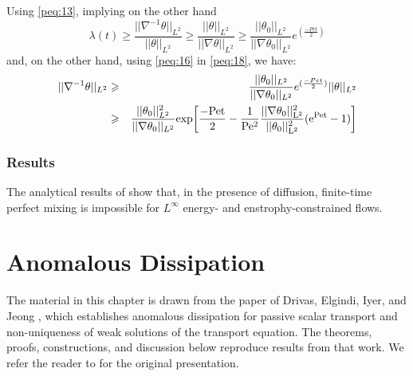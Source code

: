 \documentclass[12pt]{report}   %
\renewcommand{\geq}{\geqslant}
\numberwithin{equation}{section}
\theoremstyle{plain}
\theoremstyle{definition}
\theoremstyle{remark}
\begin{document}
Using \eqref{peq:13}, implying on the other hand
\begin{equation}
\lambda(t) \geq \frac{||\nabla^{-1}\theta||_{L^2}}{||\theta||_{L^2}} \geq \frac{||\theta||_{L^2}}{||\nabla\theta||_{L^2}} \geq \frac{||\theta_0||_{L^2}}{||\nabla\theta_0||_{L^2}} e^{(\frac{-Pe t}{2})} \label{peq:18}
\end{equation}
and, on the other hand, using \eqref{peq:16} in \eqref{peq:18}, we have:
\begin{eqnarray*}
||\nabla^{-1}\theta||_{L^2} &\geq& \frac{||\theta_0||_{L^2}}{||\nabla\theta_0||_{L^2}} e^{(\frac{-Pe t}{2})} ||\theta||_{L^2} \\
&\geq& \frac{||\theta_0||_{L^2}^2}{||\nabla\theta_0||_{L^2}} \rm{exp}{ \left[
\frac{-Pe t}{2} - \frac{1}{Pe^2}\frac{||\nabla\theta_0||_{L^2}^2}{||\theta_0||_{L^2}^2}(e^{Pe t}-1) \right]}
\end{eqnarray*}

\subsection{Results}
The analytical results of \cite{LunasinLinEA12} show that, in the presence of diffusion, finite-time perfect mixing is impossible for $L^\infty$ energy- and enstrophy-constrained flows.


\chapter{Anomalous Dissipation}
The material in this chapter is drawn from the paper of Drivas, Elgindi, Iyer, and Jeong \cite{DrivasElgindiEA22}, which establishes anomalous dissipation for passive scalar transport and non-uniqueness of weak solutions of the transport equation. The theorems, proofs, constructions, and discussion below reproduce results from that work. We refer the reader to \cite{DrivasElgindiEA22} for the original presentation.
\end{document}
